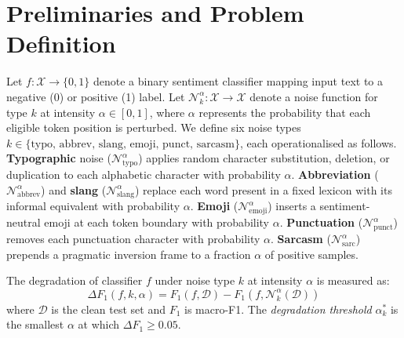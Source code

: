 \documentclass[sigconf]{acmart}
\begin{document}
\section{Preliminaries and Problem Definition}

Let $f: \mathcal{X} \to \{0, 1\}$ denote a binary sentiment
classifier mapping input text to a negative (0) or positive (1)
label.
Let $\mathcal{N}_k^\alpha: \mathcal{X} \to \mathcal{X}$ denote a
noise function for type $k$ at intensity $\alpha \in [0, 1]$,
where $\alpha$ represents the probability that each eligible token
position is perturbed.
We define six noise types $k \in \{\text{typo, abbrev, slang,
emoji, punct, sarcasm}\}$, each operationalised as follows.
\textbf{Typographic} noise ($\mathcal{N}_{\text{typo}}^\alpha$)
applies random character substitution, deletion, or duplication to
each alphabetic character with probability $\alpha$.
\textbf{Abbreviation} ($\mathcal{N}_{\text{abbrev}}^\alpha$) and
\textbf{slang} ($\mathcal{N}_{\text{slang}}^\alpha$) replace each
word present in a fixed lexicon with its informal equivalent with
probability $\alpha$.
\textbf{Emoji} ($\mathcal{N}_{\text{emoji}}^\alpha$) inserts a
sentiment-neutral emoji at each token boundary with probability
$\alpha$.
\textbf{Punctuation} ($\mathcal{N}_{\text{punct}}^\alpha$) removes
each punctuation character with probability $\alpha$.
\textbf{Sarcasm} ($\mathcal{N}_{\text{sarc}}^\alpha$) prepends a
pragmatic inversion frame to a fraction $\alpha$ of positive samples.

The degradation of classifier $f$ under noise type $k$ at intensity
$\alpha$ is measured as:
\begin{equation}
  \Delta F_1(f, k, \alpha) = F_1(f, \mathcal{D}) -
  F_1(f, \mathcal{N}_k^\alpha(\mathcal{D}))
\end{equation}
where $\mathcal{D}$ is the clean test set and $F_1$ is macro-F1.
The \emph{degradation threshold} $\alpha^*_k$ is the smallest
$\alpha$ at which $\Delta F_1 \geq 0.05$.
\end{document}
